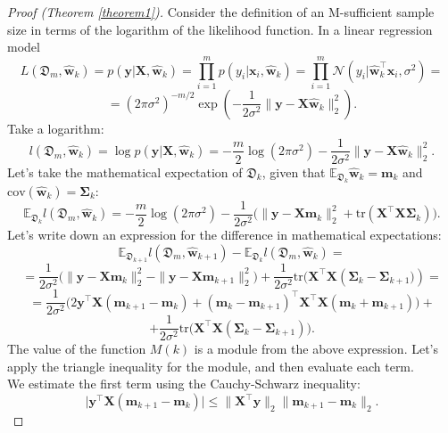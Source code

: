 \documentclass[
11pt,%
tightenlines,%
twoside,%
onecolumn,%
nofloats,%
nobibnotes,%
nofootinbib,%
superscriptaddress,%
noshowpacs,%
centertags]%
{revtex4-2}
\begin{document}
\begin{proof}[Proof (Theorem \ref{theorem1})]
Consider the definition of an M-sufficient sample size in terms of the logarithm of the likelihood function. In a linear regression model
    \[ L\left( \mathfrak{D}_m, \hat{\mathbf{w}}_k \right) = p(\mathbf{y} | \mathbf{X}, \hat{\mathbf{w}}_k) = \prod_{i=1}^{m} p(y_i | \mathbf{x}_i, \hat{\mathbf{w}}_k) = \prod_{i=1}^{m} \mathcal{N}\left( y_i | \hat{\mathbf{w}}_k^{\top} \mathbf{x}_i, \sigma^2 \right) = \]
    \[= \left(2\pi\sigma^2 \right)^{-m/2} \exp\left(-\dfrac{1}{2\sigma^2}\|\mathbf{y} -\mathbf{X} \hat{\mathbf{w}}_k\|_2^2 \right). \]
Take a logarithm:
    \[ l\left( \mathfrak{D}_m, \hat{\mathbf{w}}_k \right) = \log p(\mathbf{y} | \mathbf{X}, \hat{\mathbf{w}}_k) = -\dfrac{m}{2}\log\left( 2\pi\sigma^2 \right) - \dfrac{1}{2\sigma^2} \| \mathbf{y} - \mathbf{X} \hat{\mathbf{w}}_k \|_2^2. \]
Let's take the mathematical expectation of $\mathfrak{D}_k$, given that $\mathbb{E}_{\mathfrak{D}_k}\hat{\mathbf{w}}_k=\mathbf{m}_k$ and $\text{cov}(\hat{\mathbf{w}}_k) = \mathbf{\Sigma}_k$:
    \[ \mathbb{E}_{\mathfrak{D}_k} l\left( \mathfrak{D}_m, \hat{\mathbf{w}}_k \right) = -\dfrac{m}{2}\log\left( 2\pi\sigma^2 \right) - \dfrac{1}{2\sigma^2} \Big( \| \mathbf{y} - \mathbf{X} \mathbf{m}_k \|_2^2 + \text{tr}\left( \mathbf{X}^{\top}\mathbf{X} \mathbf{\Sigma}_k \right) \Big). \]
    Let's write down an expression for the difference in mathematical expectations:
    \[ \mathbb{E}_{\mathfrak{D}_{k+1}} l(\mathfrak{D}_m, \hat{\mathbf{w}}_{k+1}) - \mathbb{E}_{\mathfrak{D}_k} l(\mathfrak{D}_m, \hat{\mathbf{w}}_{k}) = \]
    \[ = \dfrac{1}{2\sigma^2} \Big( \| \mathbf{y} - \mathbf{X} \mathbf{m}_k \|_2^2 - \| \mathbf{y} - \mathbf{X} \mathbf{m}_{k+1} \|_2^2 \Big) + \dfrac{1}{2\sigma^2} \text{tr} \Big( \mathbf{X}^{\top}\mathbf{X} \left( \mathbf{\Sigma}_k - \mathbf{\Sigma}_{k+1} \Big) \right) = \]
    \[ = \dfrac{1}{2\sigma^2} \Big( 2 \mathbf{y}^{\top} \mathbf{X} (\mathbf{m}_{k+1} - \mathbf{m}_k) + (\mathbf{m}_k - \mathbf{m}_{k+1})^{\top} \mathbf{X}^{\top}\mathbf{X} (\mathbf{m}_k + \mathbf{m}_{k+1}) \Big) + \]
    \[ + \dfrac{1}{2\sigma^2} \text{tr} \Big( \mathbf{X}^{\top}\mathbf{X} \left( \mathbf{\Sigma}_k - \mathbf{\Sigma}_{k+1} \right) \Big). \]
The value of the function $M(k)$ is a module from the above expression. Let's apply the triangle inequality for the module, and then evaluate each term.\\
We estimate the first term using the Cauchy-Schwarz inequality:
\[\big| \mathbf{y}^{\top}\mathbf{X}(\mathbf{m}_{k+1}-\mathbf{m}_k)\big| \leqslant \| \mathbf{X}^{\top}\mathbf{y} \|_2 \|\mathbf{m}_{k+1} - \mathbf{m}_k\|_2. \]

\end{proof}
\end{document}
